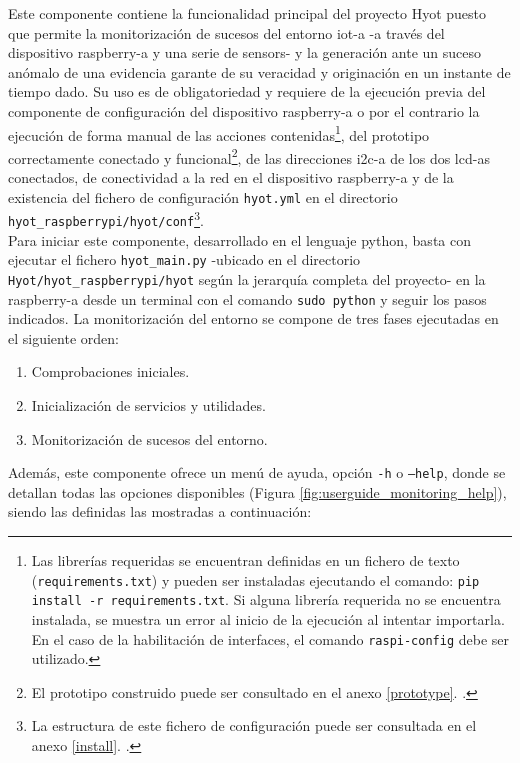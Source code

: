 \documentclass[12pt,a4paper, twoside]{report}
\begin{document}
	 Este componente contiene la funcionalidad principal del proyecto Hyot puesto que permite la monitorización de sucesos del entorno \gls{iot-a} -a través del dispositivo \gls{raspberry-a} y una serie de \glspl{sensor}- y la generación ante un suceso anómalo de una evidencia garante de su veracidad y originación en un instante de tiempo dado. Su uso es de obligatoriedad y requiere de la ejecución previa del componente de configuración del dispositivo \gls{raspberry-a} o por el contrario la ejecución de forma manual de las acciones contenidas\footnote{Las librerías requeridas se encuentran definidas en un fichero de texto (\texttt{requirements.txt}) y pueden ser instaladas ejecutando el comando: \texttt{pip install -r requirements.txt}. Si alguna librería requerida no se encuentra instalada, se muestra un error al inicio de la ejecución al intentar importarla. En el caso de la habilitación de interfaces, el comando \texttt{raspi-config} debe ser utilizado.}, del prototipo correctamente conectado y funcional\footnote{El prototipo construido puede ser consultado en el anexo \ref{prototype}. .}, de las direcciones \gls{i2c-a} de los dos \glspl{lcd-a} conectados, de conectividad a la red en el dispositivo \gls{raspberry-a} y de la existencia del fichero de configuración \texttt{hyot.yml} en el directorio \texttt{hyot\_raspberrypi/hyot/conf}\footnote{La estructura de este fichero de configuración puede ser consultada en el anexo \ref{install}. .}. \\
	 
	Para iniciar este componente, desarrollado en el lenguaje \gls{python}, basta con ejecutar el fichero \texttt{hyot\_main.py} -ubicado en el directorio \texttt{Hyot/hyot\_raspberrypi/hyot} según la jerarquía completa del proyecto- en la \gls{raspberry-a} desde un terminal con el comando \texttt{sudo python} y seguir los pasos indicados. La monitorización del entorno se compone de tres fases ejecutadas en el siguiente orden:
	
	\begin{enumerate}
		\item Comprobaciones iniciales.
		\item Inicialización de servicios y utilidades.
		\item Monitorización de sucesos del entorno.
	\end{enumerate}
	
	Además, este componente ofrece un menú de ayuda, opción \texttt{-h} o \texttt{--help}, donde se detallan todas las opciones disponibles (Figura \ref{fig:userguide_monitoring_help}), siendo las definidas las mostradas a continuación:
	
\end{document}

